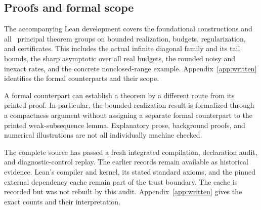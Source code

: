 \documentclass[11pt]{article}
\begin{document}
\subsection*{Proofs and formal scope}
The accompanying Lean development covers the foundational constructions and all \EditionPrincipalGroups\ principal theorem groups on bounded realization, budgets, regularization, and certificates. This includes the actual infinite diagonal family and its tail bounds, the sharp asymptotic over all real budgets, the rounded noisy and inexact rates, and the concrete nonclosed-range example. Appendix~\ref{app:written} identifies the formal counterparts and their scope.

A formal counterpart can establish a theorem by a different route from its printed proof. In particular, the bounded-realization result is formalized through a compactness argument without assigning a separate formal counterpart to the printed weak-subsequence lemma. Explanatory prose, background proofs, and numerical illustrations are not all individually machine checked.

The complete source has passed a fresh integrated compilation, declaration audit, and diagnostic-control replay. The earlier records remain available as historical evidence. Lean's compiler and kernel, its stated standard axioms, and the pinned external dependency cache remain part of the trust boundary. The cache is recorded but was not rebuilt by this audit. Appendix~\ref{app:written} gives the exact counts and their interpretation.

\clearpage\begingroup\setlength{\parskip}{0pt}\tableofcontents\endgroup
\clearpage{}





















\appendix






\end{document}
